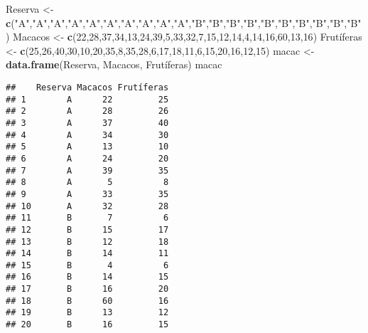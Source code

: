 \documentclass[]{article}
\newenvironment{Shaded}{\begin{snugshade}}{\end{snugshade}}
\newcommand{\DecValTok}[1]{\textcolor[rgb]{0.00,0.00,0.81}{#1}}
\newcommand{\KeywordTok}[1]{\textcolor[rgb]{0.13,0.29,0.53}{\textbf{#1}}}
\newcommand{\NormalTok}[1]{#1}
\newcommand{\StringTok}[1]{\textcolor[rgb]{0.31,0.60,0.02}{#1}}
\begin{document}
\begin{Shaded}
\begin{Highlighting}[]
\NormalTok{Reserva <-}\StringTok{ }\KeywordTok{c}\NormalTok{(}\StringTok{"A"}\NormalTok{,}\StringTok{"A"}\NormalTok{,}\StringTok{"A"}\NormalTok{,}\StringTok{"A"}\NormalTok{,}\StringTok{"A"}\NormalTok{,}\StringTok{"A"}\NormalTok{,}\StringTok{"A"}\NormalTok{,}\StringTok{"A"}\NormalTok{,}\StringTok{"A"}\NormalTok{,}\StringTok{"A"}\NormalTok{,}\StringTok{"B"}\NormalTok{,}\StringTok{"B"}\NormalTok{,}\StringTok{"B"}\NormalTok{,}\StringTok{"B"}\NormalTok{,}\StringTok{"B"}\NormalTok{,}\StringTok{"B"}\NormalTok{,}\StringTok{"B"}\NormalTok{,}\StringTok{"B"}\NormalTok{,}\StringTok{"B"}\NormalTok{,}\StringTok{"B"}\NormalTok{)}
\NormalTok{Macacos <-}\StringTok{ }\KeywordTok{c}\NormalTok{(}\DecValTok{22}\NormalTok{,}\DecValTok{28}\NormalTok{,}\DecValTok{37}\NormalTok{,}\DecValTok{34}\NormalTok{,}\DecValTok{13}\NormalTok{,}\DecValTok{24}\NormalTok{,}\DecValTok{39}\NormalTok{,}\DecValTok{5}\NormalTok{,}\DecValTok{33}\NormalTok{,}\DecValTok{32}\NormalTok{,}\DecValTok{7}\NormalTok{,}\DecValTok{15}\NormalTok{,}\DecValTok{12}\NormalTok{,}\DecValTok{14}\NormalTok{,}\DecValTok{4}\NormalTok{,}\DecValTok{14}\NormalTok{,}\DecValTok{16}\NormalTok{,}\DecValTok{60}\NormalTok{,}\DecValTok{13}\NormalTok{,}\DecValTok{16}\NormalTok{)}
\NormalTok{Frutíferas <-}\StringTok{ }\KeywordTok{c}\NormalTok{(}\DecValTok{25}\NormalTok{,}\DecValTok{26}\NormalTok{,}\DecValTok{40}\NormalTok{,}\DecValTok{30}\NormalTok{,}\DecValTok{10}\NormalTok{,}\DecValTok{20}\NormalTok{,}\DecValTok{35}\NormalTok{,}\DecValTok{8}\NormalTok{,}\DecValTok{35}\NormalTok{,}\DecValTok{28}\NormalTok{,}\DecValTok{6}\NormalTok{,}\DecValTok{17}\NormalTok{,}\DecValTok{18}\NormalTok{,}\DecValTok{11}\NormalTok{,}\DecValTok{6}\NormalTok{,}\DecValTok{15}\NormalTok{,}\DecValTok{20}\NormalTok{,}\DecValTok{16}\NormalTok{,}\DecValTok{12}\NormalTok{,}\DecValTok{15}\NormalTok{)}
\NormalTok{macac <-}\StringTok{ }\KeywordTok{data.frame}\NormalTok{(Reserva, Macacos, Frutíferas)}
\NormalTok{macac}
\end{Highlighting}
\end{Shaded}

\begin{verbatim}
##    Reserva Macacos Frutíferas
## 1        A      22         25
## 2        A      28         26
## 3        A      37         40
## 4        A      34         30
## 5        A      13         10
## 6        A      24         20
## 7        A      39         35
## 8        A       5          8
## 9        A      33         35
## 10       A      32         28
## 11       B       7          6
## 12       B      15         17
## 13       B      12         18
## 14       B      14         11
## 15       B       4          6
## 16       B      14         15
## 17       B      16         20
## 18       B      60         16
## 19       B      13         12
## 20       B      16         15
\end{verbatim}
\end{document}
